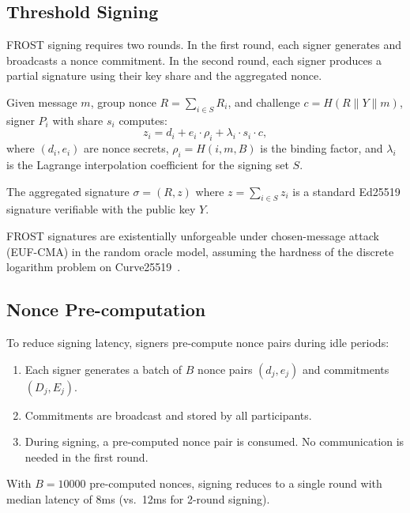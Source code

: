 \subsection{Threshold Signing}

FROST signing requires two rounds. In the first round, each signer generates
and broadcasts a nonce commitment. In the second round, each signer produces a
partial signature using their key share and the aggregated nonce.

\begin{definition}
Given message $m$, group nonce $R = \sum_{i \in S} R_i$, and challenge
$c = H(R \| Y \| m)$, signer $P_i$ with share $s_i$ computes:
\begin{equation}
z_i = d_i + e_i \cdot \rho_i + \lambda_i \cdot s_i \cdot c,
\end{equation}
where $(d_i, e_i)$ are nonce secrets, $\rho_i = H(i, m, B)$ is the binding
factor, and $\lambda_i$ is the Lagrange interpolation coefficient for the
signing set $S$.
\end{definition}

The aggregated signature $\sigma = (R, z)$ where $z = \sum_{i \in S} z_i$ is a
standard Ed25519 signature verifiable with the public key $Y$.

\begin{proposition}[Unforgeability]
FROST signatures are existentially unforgeable under chosen-message attack
(EUF-CMA) in the random oracle model, assuming the hardness of the discrete
logarithm problem on Curve25519~\cite{frost}.
\end{proposition}

\subsection{Nonce Pre-computation}

To reduce signing latency, signers pre-compute nonce pairs during idle periods:
\begin{enumerate}[leftmargin=1.4em]
    \item Each signer generates a batch of $B$ nonce pairs $(d_j, e_j)$ and
    commitments $(D_j, E_j)$.
    \item Commitments are broadcast and stored by all participants.
    \item During signing, a pre-computed nonce pair is consumed. No
    communication is needed in the first round.
\end{enumerate}

With $B = 10000$ pre-computed nonces, signing reduces to a single round with
median latency of 8ms (vs.\ 12ms for 2-round signing).

